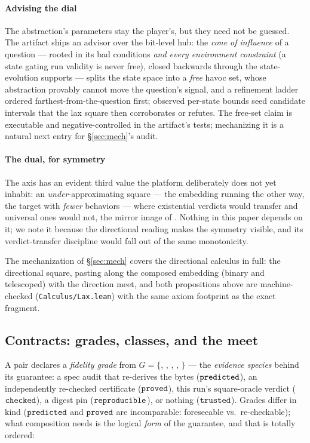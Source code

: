 \paragraph{Advising the dial}
The abstraction's parameters stay the player's, but they need not be
guessed. The artifact ships an advisor over the bit-level hub: the
\emph{cone of influence} of a question --- rooted in its bad
conditions \emph{and every environment constraint} (a state gating
run validity is never free), closed backwards through the
state-evolution supports --- splits the state space into a
\emph{free} havoc set, whose abstraction provably cannot move the
question's signal, and a refinement ladder ordered
farthest-from-the-question first; observed per-state bounds seed
candidate intervals that the lax square then corroborates or refutes.
The free-set claim is executable and negative-controlled in the
artifact's tests; mechanizing it is a natural next entry for
\S\ref{sec:mech}'s audit.

\paragraph{The dual, for symmetry}
The axis has an evident third value the platform deliberately does not
yet inhabit: an \emph{under}-approximating square --- the embedding
running the other way, the target with \emph{fewer} behaviors ---
where existential verdicts would transfer and universal ones would
not, the mirror image of . Nothing in this paper
depends on it; we note it because the directional reading makes the
symmetry visible, and its verdict-transfer discipline would fall out
of the same monotonicity.

The mechanization of \S\ref{sec:mech} covers the directional calculus
in full: the directional square, pasting along the composed embedding
(binary and telescoped) with the direction meet, and both propositions
above are machine-checked (\texttt{Calculus/Lax.lean}) with the same
axiom footprint as the exact fragment.

\subsection{Contracts: grades, classes, and the meet}
\label{sec:fidelity}
\label{sec:grades}

A pair declares a \emph{fidelity grade} from
$G = \{$\ttrust, \trepr, \tchk, \tpred, \tprov$\}$ --- the
\emph{evidence species} behind its guarantee: a spec audit that
re-derives the bytes ($\mathtt{predicted}$), an independently re-checked
certificate ($\mathtt{proved}$), this run's square-oracle verdict ($\mathtt{checked}$), a
digest pin ($\mathtt{reproducible}$), or nothing ($\mathtt{trusted}$). Grades differ in kind
($\mathtt{predicted}$ and $\mathtt{proved}$ are incomparable: foreseeable vs.\
re-checkable); what composition needs is the logical \emph{form} of
the guarantee, and that is totally ordered:

